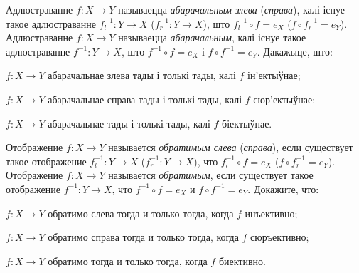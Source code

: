 \documentclass[12pt, a4paper]{article}
\begin{document}
\begin{problemList}
\problemItemSimple
{%
Адлюстраванне $f \colon X \to Y$ называецца \textit{абарачальным злева} (\textit{справа}),
калі існуе такое адлюстраванне
$f_l^{-1} \colon Y \to X$ ($f_r^{-1} \colon Y \to X$), што $f_l^{-1} \circ f = e_X$ ($f \circ f_r^{-1} = e_Y$).
Адлюстраванне $f \colon X \to Y$ называецца \textit{абарачальным},
калі існуе такое адлюстраванне $f^{-1} \colon Y \to X$, што $f^{-1} \circ f = e_X$ і $f \circ f^{-1} = e_Y$.
Дакажыце, што:
\begin{belarusianEnumerate}
    \item $f \colon X \to Y$ абарачальнае злева тады і толькі тады, калі $f$ ін'ектыўнае;
    \item $f \colon X \to Y$ абарачальнае справа тады і толькі тады, калі $f$ сюр'ектыўнае;
    \item $f \colon X \to Y$ абарачальнае тады і толькі тады, калі $f$ біектыўнае.
\end{belarusianEnumerate}
}
{%
Отображение $f \colon X \to Y$ называется \textit{обратимым слева} (\textit{справа}),
если существует такое отображение
$f_l^{-1} \colon Y \to X$ ($f_r^{-1} \colon Y \to X$), что $f_l^{-1} \circ f = e_X$ ($f \circ f_r^{-1} = e_Y$).
Отображение $f \colon X \to Y$ называется \textit{обратимым},
если существует такое отображение $f^{-1} \colon Y \to X$, что $f^{-1} \circ f = e_X$ и $f \circ f^{-1} = e_Y$.
Докажите, что:
\begin{russianEnumerate}
    \item $f \colon X \to Y$ обратимо слева тогда и только тогда, когда $f$ инъективно;
    \item $f \colon X \to Y$ обратимо справа тогда и только тогда, когда $f$ сюръективно;
    \item $f \colon X \to Y$ обратимо тогда и только тогда, когда $f$ биективно.
\end{russianEnumerate}
}

\end{problemList}
\end{document}
